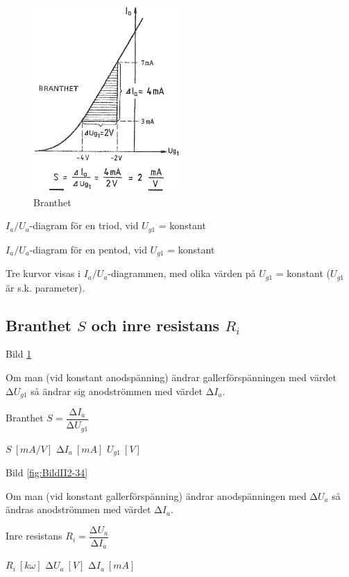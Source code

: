 \begin{figure}
\includegraphics[width=0.5\textwidth]{images/cropped_pdfs/bild_2_2-33.pdf}
\caption{Branthet}
\label{fig:BildII2-33}
\end{figure}

\(I_a/U_a\)-diagram för en triod, vid \(U_{g1}\) = konstant

\(I_a/U_a\)-diagram för en pentod, vid \(U_{g1}\) = konstant

Tre kurvor visas i \(I_a/U_a\)-diagrammen, med olika värden på
\(U_{g1}\) = konstant (\(U_{g1}\) är s.k. parameter).

\subsection{Branthet $S$ och inre resistans $R_i$}

Bild \ref{fig:BildII2-33}

Om man (vid konstant anodspänning) ändrar gallerförspänningen med värdet
\(∆U_{g1}\) så ändrar sig anodströmmen med värdet \(∆I_a\).

Branthet \(S = \dfrac{∆I_a}{∆U_{g1}}\)

\(S\ [mA/V]\) \(∆I_a\ [mA]\) \(U_{g1}\ [V]\)

Bild \ref{fig:BildII2-34}

Om man (vid konstant gallerförspänning) ändrar anodspänningen med
\(∆U_a\) så ändras anodströmmen med värdet \(∆I_a\).

Inre resistans \(R_i = \dfrac{∆U_a}{∆I_a}\)

\(R_i\ [k \omega]\)  \(∆U_a\ [V]\)  \(∆I_a\ [mA]\)

